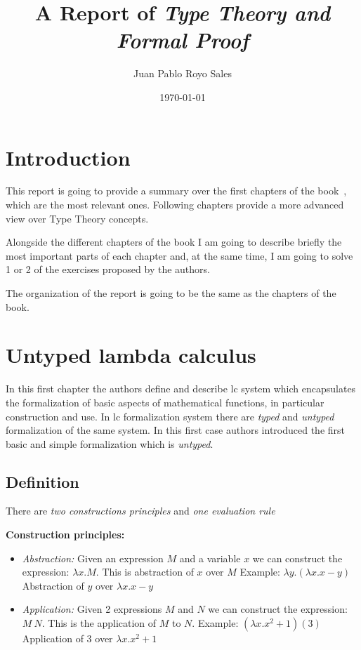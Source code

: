 \documentclass[12pt, a4paper]{article}
\title{%
      A Report of \textit{Type Theory and Formal Proof}
}
\author{Juan Pablo Royo Sales}
\affil{Universitat Politècnica de Catalunya}
\date\today
\begin{document}
\maketitle

\tableofcontents

\section{Introduction}
This report is going to provide a summary over the first chapters of the book~\cite{type_theory}, which are the most relevant ones.
Following chapters provide a more advanced view over Type Theory concepts.

Alongside the different chapters of the book I am going to describe briefly the most important parts of each chapter and, at the same time,
I am going to solve 1 or 2 of the exercises proposed by the authors.

The organization of the report is going to be the same as the chapters of the book.

\section{Untyped lambda calculus}
In this first chapter the authors define and describe \acrfull{lc} system which encapsulates the formalization of basic aspects
of mathematical functions, in particular construction and use. In \acrshort{lc} formalization system there are \textit{typed} and \textit{untyped} 
formalization of the same system. In this first case authors introduced the first basic and simple formalization which is \textit{untyped}.

\subsection{Definition}
There are \textit{two constructions principles} and \textit{one evaluation rule}

\textbf{Construction principles:}

\begin{itemize}
    \item \textit{Abstraction:} Given an expression $M$ and a variable $x$ we can construct the expression: $\lambda x.M$. This is abstraction of $x$ over $M$
    Example: $\lambda y.(\lambda x. x - y)$ Abstraction of $y$ over $\lambda x. x - y$
    \item \textit{Application:} Given 2 expressions $M$ and $N$ we can construct the expression: $M\ N$. This is the application of $M$ to $N$.
    Example: $(\lambda x.x^2 + 1)(3)$ Application of $3$ over $\lambda x.x^2 + 1$
\end{itemize}
\end{document}
